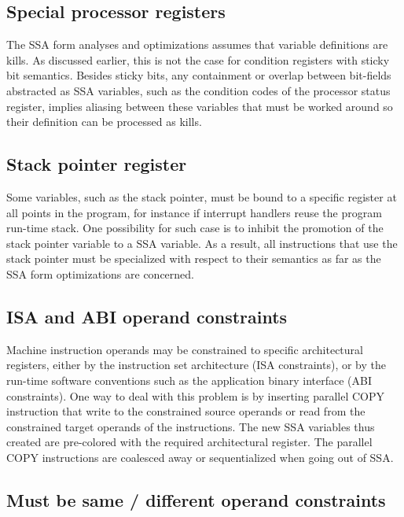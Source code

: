 \subsection{Special processor registers}

The SSA form analyses and optimizations assumes that variable definitions
are kills. As discussed earlier, this is not the case for condition registers
with sticky bit semantics. Besides sticky bits, any containment or overlap
between bit-fields abstracted as SSA variables, such as the condition codes of
the processor status register, implies aliasing between these variables that
must be worked around so their definition can be processed as kills.

\subsection{Stack pointer register}

Some variables, such as the stack pointer, must be bound to a specific
register at all points in the program, for instance if interrupt handlers reuse
the program run-time stack. One possibility for such case is to inhibit the
promotion of the stack pointer variable to a SSA variable. As a result, all
instructions that use the stack pointer must be specialized with respect to
their semantics as far as the SSA form optimizations are concerned.

\subsection{ISA and ABI operand constraints}

Machine instruction operands may be constrained to specific architectural
registers, either by the instruction set architecture (ISA constraints), or by
the run-time software conventions such as the application binary interface (ABI
constraints). One way to deal with this problem is by inserting parallel COPY
instruction that write to the constrained source operands or read from the constrained
target operands of the instructions. The new SSA variables thus created are pre-colored
with the required architectural register. The parallel COPY instructions are
coalesced away or sequentialized when going out of SSA.

\subsection{Must be same / different operand constraints}

